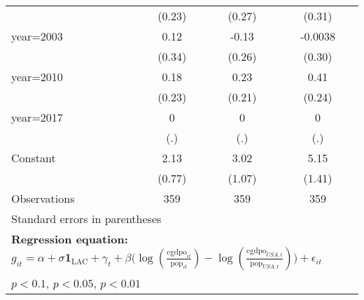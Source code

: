\begin{sidewaystable}[htbp]
\begin{tabular}{l*{3}{c}}
                &   (0.23)         &   (0.27)         &   (0.31)         \\
\addlinespace
year=2003       &     0.12         &    -0.13         &  -0.0038         \\
                &   (0.34)         &   (0.26)         &   (0.30)         \\
\addlinespace
year=2010       &     0.18         &     0.23         &     0.41\sym{*}  \\
                &   (0.23)         &   (0.21)         &   (0.24)         \\
\addlinespace
year=2017       &        0         &        0         &        0         \\
                &      (.)         &      (.)         &      (.)         \\
\addlinespace
Constant        &     2.13\sym{***}&     3.02\sym{***}&     5.15\sym{***}\\
                &   (0.77)         &   (1.07)         &   (1.41)         \\
\midrule
Observations    &      359         &      359         &      359         \\
\bottomrule
\multicolumn{4}{l}{\footnotesize Standard errors in parentheses}\\
\multicolumn{4}{l}{\footnotesize \textbf{Regression equation:} \(g_{it} = \alpha + \sigma \mathbf{1}_{\textrm{LAC}} + \gamma_t + \beta \big(\log (\frac{\textrm{cgdpo}_{it}}{\textrm{pop}_{it}} ) - \log (\frac{\textrm{cgdpo}_{USA,t}}{\textrm{pop}_{USA,t}}  ) \big) + \epsilon_{it}\)}\\
\multicolumn{4}{l}{\footnotesize \sym{*} \(p<0.1\), \sym{**} \(p<0.05\), \sym{***} \(p<0.01\)}\\
\end{tabular}
\end{sidewaystable}
